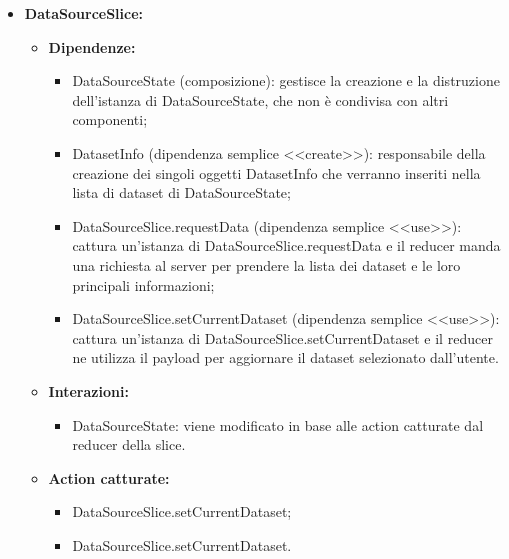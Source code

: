 \begin{itemize}
    \item \textbf{DataSourceSlice:}
          \begin{itemize}
              \item \textbf{Dipendenze:}
                    \begin{itemize}
                        \item DataSourceState (composizione): gestisce la creazione e la distruzione
                              dell'istanza di DataSourceState, che non è condivisa con altri componenti;
                        \item DatasetInfo (dipendenza semplice <<create>>): responsabile della creazione dei
                              singoli oggetti DatasetInfo che verranno inseriti nella lista di dataset di
                              DataSourceState;
                        \item DataSourceSlice.requestData (dipendenza semplice <<use>>): cattura un'istanza
                              di DataSourceSlice.requestData e il reducer manda una richiesta al server per
                              prendere la lista dei dataset e le loro principali informazioni;
                        \item DataSourceSlice.setCurrentDataset (dipendenza semplice <<use>>): cattura
                              un'istanza di DataSourceSlice.setCurrentDataset e il reducer ne utilizza il
                              payload per aggiornare il dataset selezionato dall'utente.
                    \end{itemize}
              \item \textbf{Interazioni:}
                    \begin{itemize}
                        \item DataSourceState: viene modificato in base alle action catturate dal reducer
                              della slice.
                    \end{itemize}
              \item \textbf{Action catturate:}
                    \begin{itemize}
                        \item DataSourceSlice.setCurrentDataset;
                        \item DataSourceSlice.setCurrentDataset.
                    \end{itemize}
          \end{itemize}


\end{itemize}

